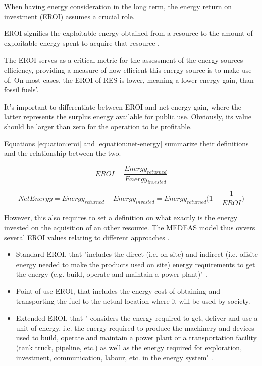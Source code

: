 When having energy consideration in the long term, the energy return on investment (EROI) assumes a crucial role.

EROI signifies the exploitable energy obtained from a resource to the amount of exploitable energy spent to acquire that resource \cite{wiki-eroi}.

The EROI serves as a critical metric for the assessment of the energy sources efficiency, providing a measure of how efficient this energy source is to make use of. On most cases, the EROI of RES is lower, meaning a lower energy gain, than fossil fuels'.

It's important to differentiate between EROI and net energy gain, where the latter represents the surplus energy available for public use. Obviously, its value should be larger than zero for the operation to be profitable.

Equations \ref{equation:eroi} and \ref{equation:net-energy} summarize their definitions and the relationship between the two.

\begin{equation}
    EROI=\frac{Energy_{returned}}{Energy_{invested}}
    \label{equation:eroi}
\end{equation}

\begin{equation}
    NetEnergy = Energy_{returned} - Energy_{invested} = Energy_{returned} \Big( 1 - \frac{1}{EROI}\Big)
    \label{equation:net-energy}
\end{equation}

However, this also requires to set a definition on what exactly is the energy invested on the aquisition of an other resource. The MEDEAS model thus ovvers several EROI values relating to different approaches \cite{medeas-cost-of-transition}.
\begin{itemize}
    \item Standard EROI, that "includes the direct (i.e. on site) and indirect (i.e. offsite energy needed to make the products used on site) energy requirements to get the energy (e.g. build, operate and maintain a power plant)" \cite{medeas-cost-of-transition}.
    \item Point of use EROI, that includes the energy cost of obtaining and transporting the fuel to the actual location where it will be used by society.
    \item Extended EROI, that " considers the energy required to get, deliver and use a unit of energy, i.e. the energy required to produce the machinery and devices used to build, operate and maintain a power plant or a transportation facility (tank truck, pipeline, etc.) as well as the energy required for exploration, investment, communication, labour, etc. in the energy system" \cite{medeas-cost-of-transition}.
\end{itemize}

